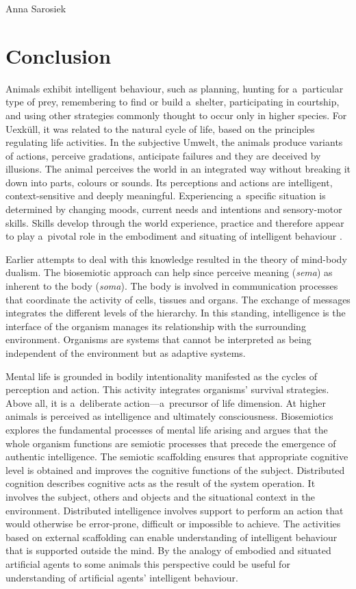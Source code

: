 \begin{artengenv}{Anna Sarosiek}
\section*{Conclusion}
Animals exhibit intelligent behaviour, such as planning, hunting for a~particular type of prey, remembering to find or build a~shelter, participating in courtship, and using other strategies commonly thought to occur only in higher species. For Uexküll, it was related to the natural cycle of life, based on the principles regulating life activities. In the subjective Umwelt, the animals produce variants of actions, perceive gradations, anticipate failures and they are deceived by illusions. The animal perceives the world in an integrated way without breaking it down into parts, colours or sounds. Its perceptions and actions are intelligent, context-sensitive and deeply meaningful. Experiencing a~specific situation is determined by changing moods, current needs and intentions and sensory-motor skills. Skills develop through the world experience, practice and therefore appear to play a~pivotal role in the embodiment and situating of intelligent behaviour
\parencites[][]{dreyfus_what_1979}[][]{searle_rediscovery_1992}.%


Earlier attempts to deal with this knowledge resulted in the theory of mind-body dualism. The biosemiotic approach can help since perceive meaning (\textit{sema}) as inherent to the body (\textit{soma}). The body is involved in communication processes that coordinate the activity of cells, tissues and organs. The exchange of messages integrates the different levels of the hierarchy. In this standing, intelligence is the interface of the organism manages its relationship with the surrounding environment. Organisms are systems that cannot be interpreted as being independent of the environment but as adaptive systems.

Mental life is grounded in bodily intentionality manifested as the cycles of perception and action. This activity integrates organisms’ survival strategies. Above all, it is a~deliberate action---a~precursor of life dimension. At higher animals is perceived as intelligence and ultimately consciousness. Biosemiotics explores the fundamental processes of mental life arising and argues that the whole organism functions are semiotic processes that precede the emergence of authentic intelligence. The semiotic scaffolding ensures that appropriate cognitive level is obtained and improves the cognitive functions of the subject. Distributed cognition describes cognitive acts as the result of the system operation. It involves the subject, others and objects and the situational context in the environment. Distributed intelligence involves support to perform an action that would otherwise be error-prone, difficult or impossible to achieve. The activities based on external scaffolding can enable understanding of intelligent behaviour that is supported outside the mind. By the analogy of embodied and situated artificial agents to some animals this perspective could be useful for understanding of artificial agents’ intelligent behaviour.

\end{artengenv}
\label{sarosiek_ende}